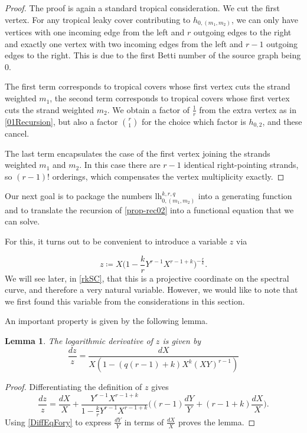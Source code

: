 \documentclass[10pt,a4paper,oneside,no-math,reqno]{amsart}%
\theoremstyle{plain}
\newtheorem{lemma}[theorem]{Lemma}
\theoremstyle{definition}
\theoremstyle{remark}
\numberwithin{equation}{section}
\newcommand{\1}{\mathds{1}}
\newcommand{\<}{\langle}
\renewcommand{\>}{\rangle}
\newcommand{\lh}{\mathord{\mathrm{l\!h}}}
\begin{document}
\begin{proof}
  The proof is again a standard tropical consideration. We cut the first vertex. For any tropical leaky cover contributing to $h_{0,(m_1,m_2)}$, we can only have vertices with one incoming edge from the left and $r$ outgoing edges to the right and exactly one vertex with two incoming edges from the left and $r-1$ outgoing edges to the right. This is due to the first Betti number of the source graph being $0$.\par
  The first term corresponds to tropical covers whose first vertex cuts the strand weighted $m_1$, the second term corresponds to tropical covers whose first vertex cuts the strand weighted $m_2$. We obtain a factor of $\frac{1}{r}$ from the extra vertex as in \cref{01Recursion}, but also a factor $ \binom{r}{1}$ for the choice which factor is $ h_{0,2}$, and these cancel.\par
  The last term encapsulates the case of the first vertex joining the strands weighted $m_1$ and $m_2$. In this case there are $r-1$ identical right-pointing strands, so $ (r-1)!$ orderings, which compensates the vertex multiplicity exactly.
\end{proof}

Our next goal is to package the numbers $\lh_{0,(m_1,m_2)}^{k,r,q}$ into a generating function and to translate the recursion of \cref{prop-rec02} into a functional equation that we can solve.

For this, it turns out to be convenient to introduce a variable $z$ via

\begin{equation}
	z \coloneq X \big( 1 - \frac{k}{r} Y^{r-1} X^{r-1+k} \big)^{-\frac{r}{k}} .
\end{equation}
We will see later, in \cref{rkSC}, that this is a projective coordinate on the spectral curve, and therefore a very natural variable. However, we would like to note that we first found this variable from the considerations in this section.


An important property is given by the following lemma.

\begin{lemma}\label{LogDerz}
	The logarithmic derivative of $z$ is given by
	\begin{equation}
		\frac{dz}{z} = \frac{dX}{X(1- (q(r-1)+k) X^k (XY)^{r-1})}
	\end{equation}
\end{lemma}	

\begin{proof}
Differentiating the definition of $z$ gives
\begin{equation}
    \frac{dz}{z}=\frac{dX}{X} + \frac{ Y^{r-1} X^{r-1+k}}{ 1 - \frac{k}{r} Y^{r-1} X^{r-1+k}} \Big( (r-1) \frac{dY}{Y} + (r-1+k) \frac{dX}{X} \Big).
\end{equation}
    Using \cref{DiffEqFory} to express $\frac{dY}{Y}$ in terms of $\frac{dX}{X}$ proves the lemma.
\end{proof}
\end{document}
